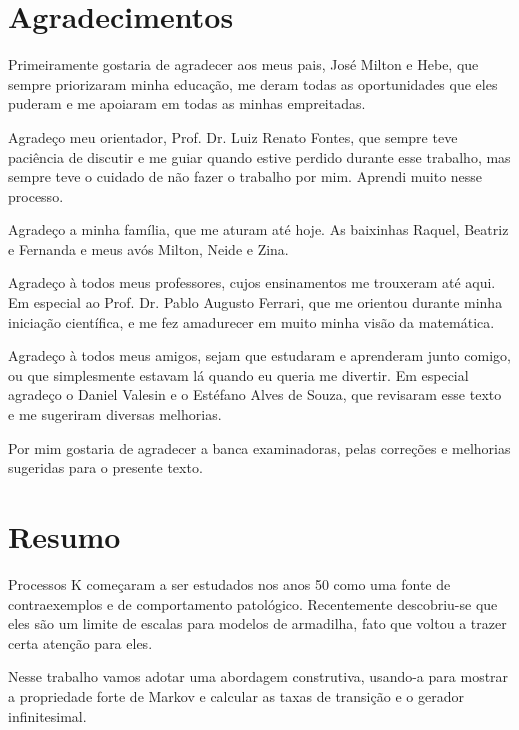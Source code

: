 \chapter*{Agradecimentos}

Primeiramente gostaria de agradecer aos meus pais, José Milton e Hebe,
que sempre priorizaram minha educação, me deram todas as oportunidades
que eles puderam e me apoiaram em todas as minhas empreitadas.

Agradeço meu orientador, Prof. Dr. Luiz Renato Fontes, que sempre
teve paciência de discutir e me guiar quando estive perdido durante
esse trabalho, mas sempre teve o cuidado de não fazer o trabalho por
mim. Aprendi muito nesse processo.

Agradeço a minha família, que me aturam até hoje. As baixinhas Raquel,
Beatriz e Fernanda e meus avós Milton, Neide e
Zina. %

Agradeço à todos meus professores, cujos ensinamentos me trouxeram até
aqui.  Em especial ao Prof. Dr. Pablo Augusto Ferrari, que me orientou
durante minha iniciação científica, e me fez amadurecer em muito minha
visão da matemática.

Agradeço à todos meus amigos, sejam que estudaram e aprenderam junto
comigo, ou que simplesmente estavam lá quando eu queria me
divertir. Em especial agradeço o Daniel Valesin e o Estéfano Alves de
Souza, que revisaram esse texto e me sugeriram diversas melhorias.

Por mim gostaria de agradecer a banca examinadoras, pelas correções e
melhorias sugeridas para o presente texto.

\chapter*{Resumo}

Processos K começaram a ser estudados nos anos 50 como uma fonte de
contraexemplos e de comportamento patológico. Recentemente
descobriu-se que eles são um limite de escalas para modelos de
armadilha, fato que voltou a trazer certa atenção para eles.

Nesse trabalho vamos adotar uma abordagem construtiva, usando-a para
mostrar a propriedade forte de Markov e calcular as taxas de transição
e o gerador infinitesimal.

